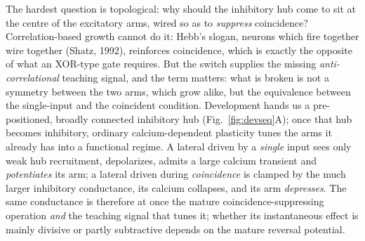 \documentclass[11pt,a4paper]{article}
\begin{document}
The hardest question is topological: why should the inhibitory hub come to sit at the centre of the excitatory arms, wired so as to \emph{suppress} coincidence? Correlation-based growth cannot do it: Hebb's slogan, neurons which fire together wire together (Shatz, 1992), reinforces coincidence, which is exactly the opposite of what an XOR-type gate requires. But the switch supplies the missing \emph{anti-correlational} teaching signal, and the term matters: what is broken is not a symmetry between the two arms, which grow alike, but the equivalence between the single-input and the coincident condition. Development hands us a pre-positioned, broadly connected inhibitory hub (Fig.~\ref{fig:devseq}A); once that hub becomes inhibitory, ordinary calcium-dependent plasticity tunes the arms it already has into a functional regime. A lateral driven by a \emph{single} input sees only weak hub recruitment, depolarizes, admits a large calcium transient and \emph{potentiates} its arm; a lateral driven during \emph{coincidence} is clamped by the much larger inhibitory conductance, its calcium collapses, and its arm \emph{depresses}. The same conductance is therefore at once the mature coincidence-suppressing operation \emph{and} the teaching signal that tunes it; whether its instantaneous effect is mainly divisive or partly subtractive depends on the mature reversal potential.
\end{document}
